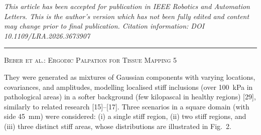 \documentclass[11pt]{article}
\begin{document}
\begin{center}
{\footnotesize\itshape
This article has been accepted for publication in IEEE Robotics and
Automation Letters. This is the author's version which has not been
fully edited and content may change prior to final publication.
Citation information: DOI 10.1109/LRA.2026.3673907\par}
\end{center}

\vspace{0.4em}
\hrule
\vspace{0.6em}

\noindent
{\footnotesize\scshape Beber et al.: Ergodic Palpation for Tissue Mapping \hfill 5}

\vspace{1.2em}

\noindent
They were generated as mixtures of Gaussian components with varying
locations, covariances, and amplitudes, modelling localised stiff
inclusions (over 100~kPa in pathological areas) in a softer
background (few kilopascal in healthy regions) [29], similarly to
related research [15]--[17]. Three scenarios in a square domain
(with side 45~mm) were considered: (i) a single stiff region,
(ii) two stiff regions, and (iii) three distinct stiff areas, whose
distributions are illustrated in Fig.~2.

\vspace{0.4em}
\begin{center}
\end{center}
\end{document}
